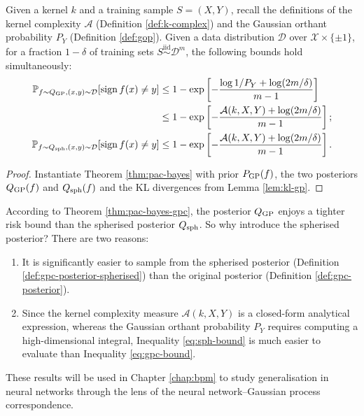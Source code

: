 \begin{refsection}
\begin{theorem}\label{thm:pac-bayes-gpc} Given a kernel $k$ and a training sample $S=(X,Y)$, recall the definitions of the kernel complexity $\mathcal{A}$ (Definition \ref{def:k-complex}) and the Gaussian orthant probability $P_Y$ (Definition \ref{def:gop}). Given a data distribution $\mathcal{D}$ over $\mathcal{X}\times\{\pm1\}$, for a fraction $1-\delta$ of training sets $S\overset{\text{iid}}{\sim}\mathcal{D}^m$, the following bounds hold simultaneously:
\begin{align}
\mathbb{P}_{f\sim Q_\mathrm{GP}, (x,y)\sim\mathcal{D}}[\operatorname{sign} f(x)\neq y] &\leq 1 - \exp \left[-\frac{\log 1/P_Y + \log (2m/\delta)}{m-1}\right] \label{eq:gpc-bound}\\
& \leq 1 - \exp \left[-\frac{\mathcal{A}(k,X,Y) + \log (2m/\delta)}{m-1}\right];\label{eq:gpc-bound-slack}\\
\mathbb{P}_{f\sim Q_\mathrm{sph}, (x,y)\sim\mathcal{D}}[\operatorname{sign} f(x)\neq y] &\leq 1 - \exp \left[-\frac{\mathcal{A}(k,X,Y) + \log (2m/\delta)}{m-1}\right]. \label{eq:sph-bound}
\end{align}
\end{theorem}
\begin{proof} Instantiate Theorem \ref{thm:pac-bayes} with prior $P_\mathrm{GP}(f)$, the two posteriors $Q_\mathrm{GP}(f)$ and $Q_\mathrm{sph}(f)$ and the KL divergences from Lemma \ref{lem:kl-gp}.
\end{proof}

According to Theorem \ref{thm:pac-bayes-gpc}, the posterior $Q_\mathrm{GP}$ enjoys a tighter risk bound than the spherised posterior $Q_\mathrm{sph}$. So why introduce the spherised posterior? There are two reasons:
\begin{enumerate}
    \item It is significantly easier to sample from the spherised posterior (Definition \ref{def:gpc-posterior-spherised}) than the original posterior (Definition \ref{def:gpc-posterior}).
    \item Since the kernel complexity measure $\mathcal{A}(k,X,Y)$ is a closed-form analytical expression, whereas the Gaussian orthant probability $P_Y$ requires computing a high-dimensional integral, Inequality \ref{eq:sph-bound} is much easier to evaluate than Inequality \ref{eq:gpc-bound}.
\end{enumerate}

These results will be used in Chapter \ref{chap:bpm} to study generalisation in neural networks through the lens of the neural network--Gaussian process correspondence.

\printbibliography[heading=subbibliography]
\end{refsection}